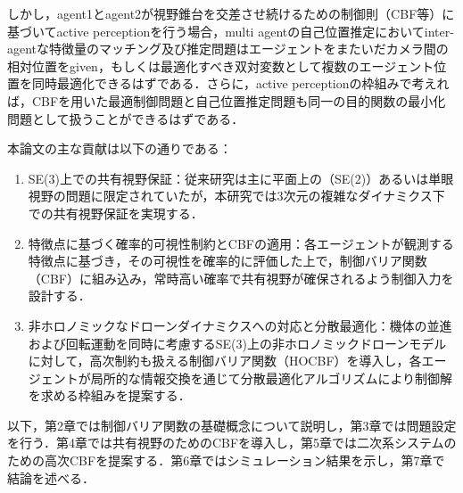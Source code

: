 しかし，agent1とagent2が視野錐台を交差させ続けるための制御則（CBF等）に基づいてactive perceptionを行う場合，multi agentの自己位置推定においてinter-agentな特徴量のマッチング及び推定問題はエージェントをまたいだカメラ間の相対位置をgiven，もしくは最適化すべき双対変数として複数のエージェント位置を同時最適化できるはずである．さらに，active perceptionの枠組みで考えれば，CBFを用いた最適制御問題と自己位置推定問題も同一の目的関数の最小化問題として扱うことができるはずである．

本論文の主な貢献は以下の通りである：

\begin{enumerate}
    \item SE(3)上での共有視野保証：従来研究は主に平面上の（SE(2)）あるいは単眼視野の問題に限定されていたが，本研究では3次元の複雑なダイナミクス下での共有視野保証を実現する．
    \item 特徴点に基づく確率的可視性制約とCBFの適用：各エージェントが観測する特徴点に基づき，その可視性を確率的に評価した上で，制御バリア関数（CBF）に組み込み，常時高い確率で共有視野が確保されるよう制御入力を設計する．
    \item 非ホロノミックなドローンダイナミクスへの対応と分散最適化：機体の並進および回転運動を同時に考慮するSE(3)上の非ホロノミックドローンモデルに対して，高次制約も扱える制御バリア関数（HOCBF）を導入し，各エージェントが局所的な情報交換を通じて分散最適化アルゴリズムにより制御解を求める枠組みを提案する．
\end{enumerate}

以下，第2章では制御バリア関数の基礎概念について説明し，第3章では問題設定を行う．第4章では共有視野のためのCBFを導入し，第5章では二次系システムのための高次CBFを提案する．第6章ではシミュレーション結果を示し，第7章で結論を述べる．
